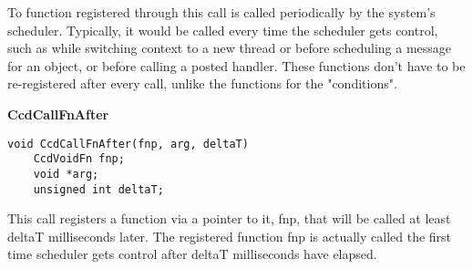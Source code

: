 To function registered through this call is called periodically by the
system's scheduler.  Typically, it would be called every time the
scheduler gets control, such as while switching context to a new
thread or before scheduling a message for an object, or before calling
a posted handler. These functions don't have to be re-registered after
every call, unlike the functions for the "conditions". 

\vspace*{0.2in}
{\bf  CcdCallFnAfter}
\begin{verbatim}
void CcdCallFnAfter(fnp, arg, deltaT)
    CcdVoidFn fnp;
    void *arg;
    unsigned int deltaT; 
\end{verbatim}

This call registers a function via a pointer to it, fnp,  that will be
called at least deltaT milliseconds later. 
The registered function fnp is actually called the first time
scheduler gets control after deltaT milliseconds have elapsed. 

